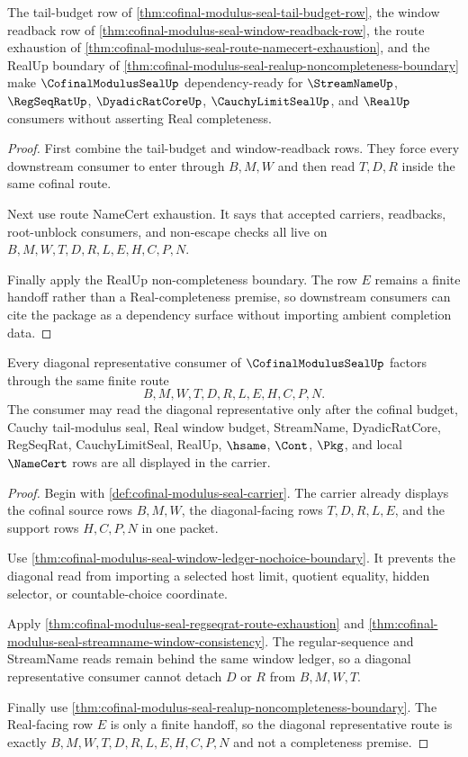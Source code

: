 \begin{theorem}
\label{thm:cofinal-modulus-seal-dependency-unblock-triad}
The tail-budget row of \autoref{thm:cofinal-modulus-seal-tail-budget-row}, the window readback row of \autoref{thm:cofinal-modulus-seal-window-readback-row}, the route exhaustion of \autoref{thm:cofinal-modulus-seal-route-namecert-exhaustion}, and the RealUp boundary of \autoref{thm:cofinal-modulus-seal-realup-noncompleteness-boundary} make $\CofinalModulusSealUp$ dependency-ready for $\StreamNameUp$, $\RegSeqRatUp$, $\DyadicRatCoreUp$, $\CauchyLimitSealUp$, and $\RealUp$ consumers without asserting Real completeness.
\end{theorem}
\begin{proof}
First combine the tail-budget and window-readback rows. They force every downstream consumer to enter through $B,M,W$ and then read $T,D,R$ inside the same cofinal route.

Next use route NameCert exhaustion. It says that accepted carriers, readbacks, root-unblock consumers, and non-escape checks all live on $B,M,W,T,D,R,L,E,H,C,P,N$.

Finally apply the RealUp non-completeness boundary. The row $E$ remains a finite handoff rather than a Real-completeness premise, so downstream consumers can cite the package as a dependency surface without importing ambient completion data.
\end{proof}

\begin{theorem}
\label{thm:cofinal-modulus-seal-diagonal-representative-handoff}
Every diagonal representative consumer of $\CofinalModulusSealUp$ factors through the same finite route
$$
B,M,W,T,D,R,L,E,H,C,P,N.
$$
The consumer may read the diagonal representative only after the cofinal budget, Cauchy tail-modulus seal, Real window budget, StreamName, DyadicRatCore, RegSeqRat, CauchyLimitSeal, RealUp, $\hsame$, $\Cont$, $\Pkg$, and local $\NameCert$ rows are all displayed in the carrier.
\end{theorem}
\begin{proof}
Begin with \autoref{def:cofinal-modulus-seal-carrier}. The carrier already displays the cofinal source rows $B,M,W$, the diagonal-facing rows $T,D,R,L,E$, and the support rows $H,C,P,N$ in one packet.

Use \autoref{thm:cofinal-modulus-seal-window-ledger-nochoice-boundary}. It prevents the diagonal read from importing a selected host limit, quotient equality, hidden selector, or countable-choice coordinate.

Apply \autoref{thm:cofinal-modulus-seal-regseqrat-route-exhaustion} and \autoref{thm:cofinal-modulus-seal-streamname-window-consistency}. The regular-sequence and StreamName reads remain behind the same window ledger, so a diagonal representative consumer cannot detach $D$ or $R$ from $B,M,W,T$.

Finally use \autoref{thm:cofinal-modulus-seal-realup-noncompleteness-boundary}. The Real-facing row $E$ is only a finite handoff, so the diagonal representative route is exactly $B,M,W,T,D,R,L,E,H,C,P,N$ and not a completeness premise.
\end{proof}

